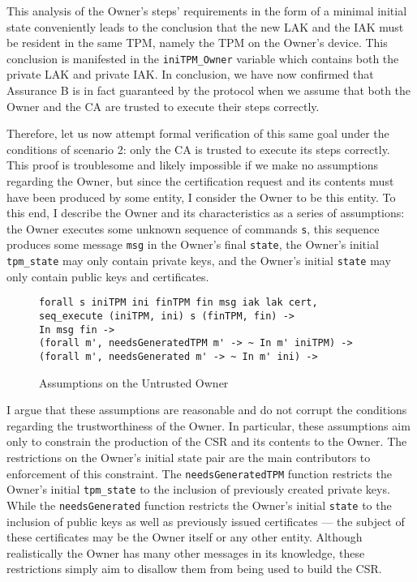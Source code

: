  This analysis of the Owner's steps' requirements in the form of a minimal initial state conveniently leads to the conclusion that the new LAK and the IAK must be resident in the same TPM, namely the TPM on the Owner's device. This conclusion is manifested in the \verb|iniTPM_Owner| variable which contains both the private LAK and private IAK. In conclusion, we have now confirmed that Assurance B is in fact guaranteed by the protocol when we assume that both the Owner and the CA are trusted to execute their steps correctly. 

Therefore, let us now attempt formal verification of this same goal under the conditions of scenario 2: only the CA is trusted to execute its steps correctly. This proof is troublesome and likely impossible if we make no assumptions regarding the Owner, but since the certification request and its contents must have been produced by some entity, I consider the Owner to be this entity.
To this end, I describe the Owner and its characteristics as a series of assumptions: the Owner executes some unknown sequence of commands \verb|s|, this sequence produces some message \verb|msg| in the Owner's final \verb|state|, the Owner's initial \verb|tpm_state| may only contain private keys, and the Owner's initial \verb|state| may only contain public keys and certificates. 
\begin{figure}[h]
\begin{lstlisting}[language=Coq]
forall s iniTPM ini finTPM fin msg iak lak cert,
seq_execute (iniTPM, ini) s (finTPM, fin) -> 
In msg fin ->
(forall m', needsGeneratedTPM m' -> ~ In m' iniTPM) ->
(forall m', needsGenerated m' -> ~ In m' ini) ->
\end{lstlisting}
\caption{Assumptions on the Untrusted Owner}
\label{fig:owner_assumptions}
\end{figure}
I argue that these assumptions are reasonable and do not corrupt the conditions regarding the trustworthiness of the Owner. In particular, these assumptions aim only to constrain the production of the CSR and its contents to the Owner. 
The restrictions on the Owner's initial state pair are the main contributors to enforcement of this constraint. The \verb|needsGeneratedTPM| function restricts the Owner's initial \verb|tpm_state| to the inclusion of previously created private keys. While the \verb|needsGenerated| function restricts the Owner's initial \verb|state| to the inclusion of public keys as well as previously issued certificates --- the subject of these certificates may be the Owner itself or any other entity.
Although realistically the Owner has many other messages in its knowledge, these restrictions simply aim to disallow them from being used to build the CSR.

